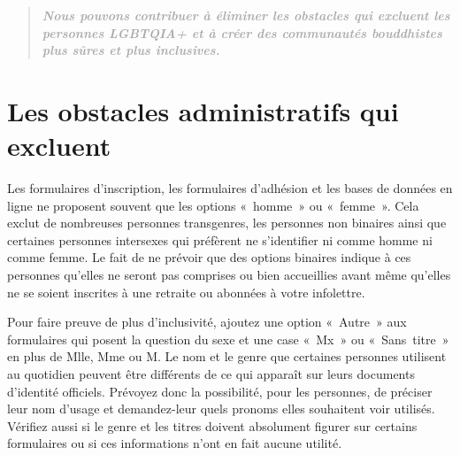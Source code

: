 \documentclass[12pt,openany]{book}
\begin{document}
\begingroup
\addtolength\leftmargin{-0.1in}
\begin{quote}
\doublespacing
\centering
\textit{\large \textbf{\textcolor{darkgray}{Nous pouvons contribuer à éliminer les obstacles qui excluent les personnes \mbox{LGBTQIA+} et à créer des communautés bouddhistes plus sûres et plus inclusives.}}}
\end{quote}
\endgroup

\section*{Les obstacles administratifs qui excluent}

\noindent Les formulaires d’inscription, les formulaires d’adhésion et les bases de données en ligne ne proposent souvent que les options \mbox{« homme »} ou \mbox{« femme »}. Cela exclut de nombreuses personnes transgenres, les personnes non binaires ainsi que certaines personnes intersexes qui préfèrent ne s’identifier ni comme homme ni comme femme. Le fait de ne prévoir que des options binaires indique à ces personnes qu’elles ne seront pas comprises ou bien accueillies avant même qu’elles ne se soient inscrites à une retraite ou abonnées à votre infolettre.

Pour faire preuve de plus d’inclusivité, ajoutez une option \mbox{« Autre »} aux formulaires qui posent la question du sexe et une case \mbox{« Mx »} ou \mbox{« Sans titre »} en plus de Mlle, Mme ou M. Le nom et le genre que certaines personnes utilisent au quotidien peuvent être différents de ce qui apparaît sur leurs documents d’identité officiels. Prévoyez donc la possibilité, pour les personnes, de préciser leur nom d’usage et demandez-leur quels pronoms elles souhaitent voir utilisés. Vérifiez aussi si le genre et les titres doivent absolument figurer sur certains formulaires ou si ces informations n’ont en fait aucune utilité.
\end{document}
